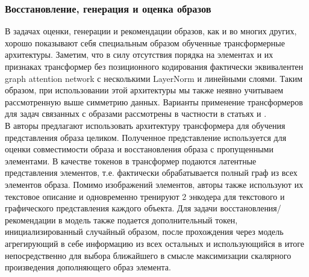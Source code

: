 \documentclass[a4paper,14pt]{extarticle}
\begin{document}
			\subsubsection{Восстановление, генерация и оценка образов}
				В задачах оценки, генерации и рекомендации образов, как и во многих других, хорошо показывают себя специальным образом обученные трансформерные \cite{https://doi.org/10.48550/arXiv.1706.03762} архитектуры. Заметим, что в силу отсутствия порядка на элементах и их признаках трансформер без позиционного кодирования \cite{https://doi.org/10.48550/arXiv.1706.03762} фактически эквивалентен graph attention network \cite{
				https://doi.org/10.48550/arXiv.1710.10903} с несколькими LayerNorm \cite{
				https://doi.org/10.48550/arXiv.1607.06450} и линейными слоями. Таким образом, при использовании этой архитектуры мы также неявно учитываем рассмотренную выше симметрию данных. 
				Варианты применение трансформеров для задач связанных с образами рассмотрены в частности в статьях \cite{https://doi.org/10.48550/arXiv.2303.02483} и \cite{https://doi.org/10.48550/arXiv.2204.04812}.\\
				
				В \cite{https://doi.org/10.48550/arXiv.2204.04812} авторы предлагают использовать архитектуру трансформера для обучения представления образа целиком. Полученное представление используется для оценки совместимости образа и восстановления образа с пропущенными элементами. В качестве токенов в трансформер подаются латентные представления элементов, т.е. фактически обрабатывается полный граф из всех элементов образа. Помимо изображений элементов, авторы также используют их текстовое описание и одновременно тренируют 2 энкодера для текстового и графического представления каждого объекта. Для задачи восстановления/рекомендации в модель также подается дополнительный токен, инициализированный случайный образом, после прохождения через модель агрегирующий в себе информацию из всех остальных и использующийся в итоге непосредственно для выбора ближайшего в смысле максимизации скалярного произведения дополняющего образ элемента.
				
\end{document}
